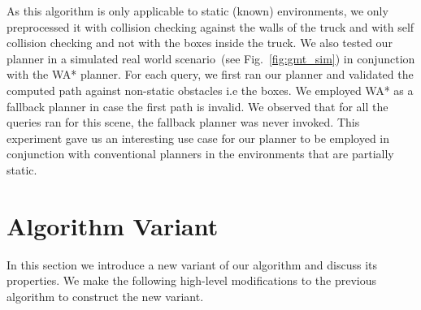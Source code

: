 \documentclass[a4paper]{report}
\begin{document}
\begin{table}[ht]
\centering
     \resizebox{0.7\columnwidth}{!}{%
        \begin{tabular}{ l | c c c c}  
           & arm & nose & arm+base & nose+base\\
         \hline
         WA* 		& 12.8 & 7.2 & 7.5 & 4.4 \\
         Our Method & 0.69 & 0.29 & 0.5 & 0.47 \\
        \end{tabular}
    }
    \caption{Comparison of mean planning times~[ms] averaged over 100 randomized queries for different modes of operation of the truck-unloading robot. The number of subregions preprocessed for each of these modes~(left to right) are~101,~7,~85 and~308.}
    \label{tab:gmt}
\end{table}

As this algorithm is only applicable to static (known) environments, we only preprocessed it with collision checking against the walls of the truck and with self collision checking and not with the boxes inside the truck. We also tested our planner in a simulated real world scenario~(see Fig.~\ref{fig:gmt_sim}) in conjunction with the WA* planner. For each query, we first ran our planner and validated the computed path against non-static obstacles i.e the boxes. We employed WA* as a fallback planner in case the first path is invalid. We observed that for all the queries ran for this scene, the fallback planner was never invoked. This experiment gave us an interesting use case for our planner to be employed in conjunction with conventional planners in the environments that are partially static.

\section{Algorithm Variant}
In this section we introduce a new variant of our algorithm and discuss its properties.
We make the following high-level modifications to the previous algorithm to construct the new variant. 
\end{document}
